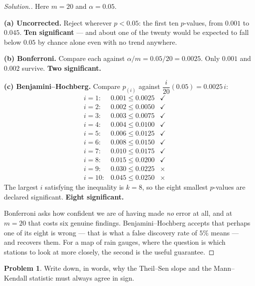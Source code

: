 \documentclass[11pt,a4paper]{article}
\theoremstyle{definition}
\newtheorem{problemx}{Problem}[section]
\newenvironment{problem}{\begin{problemx}}{\end{problemx}}
\newenvironment{solution}
  {\renewcommand{\qedsymbol}{}\begin{proof}[\textit{Solution}.]}
  {\end{proof}}
\begin{document}
\begin{solution}
Here $m = 20$ and $\alpha = 0.05$.

\textbf{(a) Uncorrected.} Reject wherever $p < 0.05$: the first ten $p$-values,
from $0.001$ to $0.045$. \textbf{Ten significant} --- and about one of the twenty
would be expected to fall below $0.05$ by chance alone even with no trend
anywhere.

\textbf{(b) Bonferroni.} Compare each against $\alpha/m = 0.05/20 = 0.0025$. Only
$0.001$ and $0.002$ survive. \textbf{Two significant.}

\textbf{(c) Benjamini--Hochberg.} Compare $p_{(i)}$ against $\dfrac{i}{20}(0.05)
= 0.0025\,i$:
$$\begin{array}{rlll}
i=1: & 0.001 \leq 0.0025 & \checkmark & \\
i=2: & 0.002 \leq 0.0050 & \checkmark & \\
i=3: & 0.003 \leq 0.0075 & \checkmark & \\
i=4: & 0.004 \leq 0.0100 & \checkmark & \\
i=5: & 0.006 \leq 0.0125 & \checkmark & \\
i=6: & 0.008 \leq 0.0150 & \checkmark & \\
i=7: & 0.010 \leq 0.0175 & \checkmark & \\
i=8: & 0.015 \leq 0.0200 & \checkmark & \\
i=9: & 0.030 \leq 0.0225 & \times & \\
i=10: & 0.045 \leq 0.0250 & \times &
\end{array}$$
The largest $i$ satisfying the inequality is $k = 8$, so the eight smallest
$p$-values are declared significant. \textbf{Eight significant.}

Bonferroni asks how confident we are of having made \emph{no} error at all, and
at $m = 20$ that costs six genuine findings. Benjamini--Hochberg accepts that
perhaps one of its eight is wrong --- that is what a false discovery rate of $5\%$
means --- and recovers them. For a map of rain gauges, where the question is which
stations to look at more closely, the second is the useful guarantee.
\end{solution}


\begin{problem}
Write down, in words, why the Theil--Sen slope and the Mann--Kendall statistic
must always agree in sign.
\end{problem}
\end{document}
